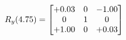 \documentclass[preview]{standalone}
\begin{document}
\begin{align*}
\special{dvisvgm:raw <g id='unique000'>}R_{y}(4.75) = \begin{bmatrix}+0.03 & 0 & -1.00 \\0 & 1 & 0 \\+1.00 & 0 & +0.03\end{bmatrix}\special{dvisvgm:raw </g>}
\end{align*}
\end{document}

